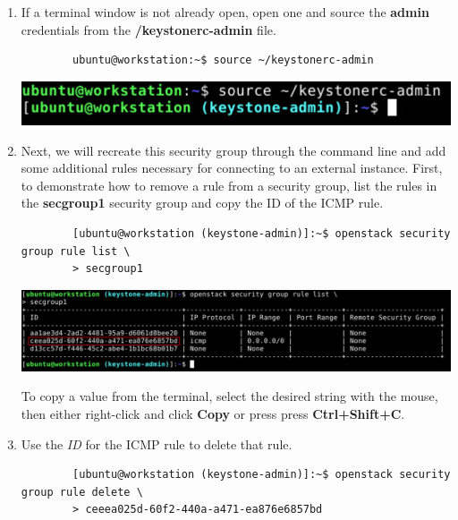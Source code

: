 \documentclass[letterpaper, 12pt]{article}
\begin{document}
\begin{enumerate}
    \item If a terminal window is not already open, open one and source the \textbf{admin} credentials from the
    \textbf{\texttildemid/keystonerc-admin} file.
    \begin{lstlisting}
        ubuntu@workstation:~$ source ~/keystonerc-admin
    \end{lstlisting}

    \begin{center}
        \includegraphics[width=\linewidth]{images/part5/step7.png}
    \end{center}

    \item Next, we will recreate this security group through the command line and add some additional rules necessary
    for connecting to an external instance. First, to demonstrate how to remove a rule from a security group, list the
    rules in the \textbf{secgroup1} security group and copy the ID of the ICMP rule.
    \begin{lstlisting}
        [ubuntu@workstation (keystone-admin)]:~$ openstack security group rule list \
        > secgroup1
    \end{lstlisting}

    \begin{center}
        \includegraphics[width=\linewidth]{images/part5/step8.png}
    \end{center}

    \begin{tipbox}
        To copy a value from the terminal, select the desired string with the mouse, then either right-click and click
        \textbf{Copy} or press press \textbf{Ctrl+Shift+C}. 
    \end{tipbox}

    \item Use the \textit{ID} for the ICMP rule to delete that rule.
    \begin{lstlisting}
        [ubuntu@workstation (keystone-admin)]:~$ openstack security group rule delete \
        > ceeea025d-60f2-440a-a471-ea876e6857bd
    \end{lstlisting}


\end{enumerate}
\end{document}
